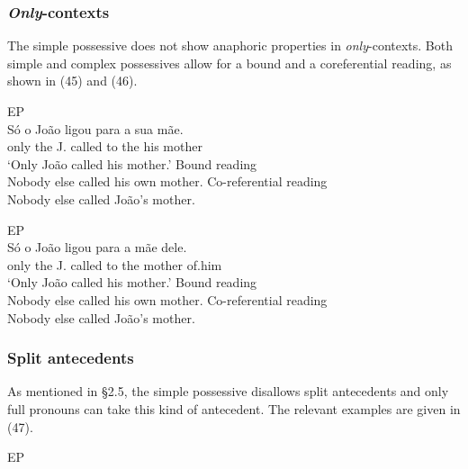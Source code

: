 \documentclass[output=paper]{langsci/langscibook}
\begin{document}
\subsubsection{\textit{Only}-contexts}%

The simple possessive does not show anaphoric properties in \textit{only}{}-contexts. Both simple and complex possessives allow for a bound and a coreferential reading, as shown in (45) and (46).

\ea%
         EP\label{ex:wein:45}\\
    \ea  
    \gll Só o João ligou para a sua mãe.\\
         only the J. called to the his mother\\
    \glt ‘Only João called his mother.’
    \ex  Bound reading\\
         Nobody else called his own mother.
    \ex  Co-referential reading\\
         Nobody else called João’s mother.
    \z
\z


\ea%
         EP\label{ex:wein:46}\\
    \ea  
    \gll Só o João ligou para a mãe dele.  \\
         only the J. called to the mother of.him\\
    \glt ‘Only João called his mother.’
    \ex  Bound reading\\
         Nobody else called his own mother.
    \ex  Co-referential reading\\
         Nobody else called João’s mother.
    \z
\z



\subsubsection{Split antecedents}%

As mentioned in §2.5, the simple possessive disallows split antecedents and only full pronouns can take this kind of antecedent. The relevant examples are given in (47).

\ea%
         EP\label{ex:wein:47}\\
    \z
\z
\end{document}
